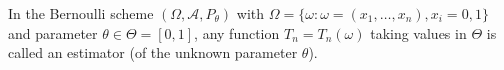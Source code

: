 In the Bernoulli scheme $(\Omega, \mathcal{A}, P_\theta)$ with $\Omega = \{\omega : \omega = (x_1, \ldots, x_n), x_i = 0, 1\}$ and parameter $\theta \in \Theta = [0, 1]$, any function $T_n = T_n(\omega)$ taking values in $\Theta$ is called an estimator (of the unknown parameter $\theta$).
